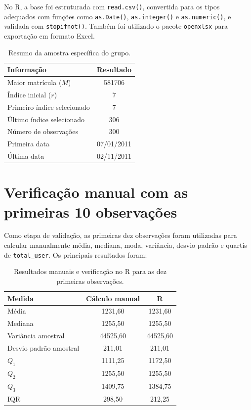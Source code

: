 \documentclass[12pt,oneside,a4paper,english,brazil]{abntex2}
\begin{document}
No R, a base foi estruturada com \texttt{read.csv()}, convertida para os tipos adequados com funções como \texttt{as.Date()}, \texttt{as.integer()} e \texttt{as.numeric()}, e validada com \texttt{stopifnot()}. Também foi utilizado o pacote \texttt{openxlsx} para exportação em formato Excel.

\begin{table}[H]
\centering
\caption{Resumo da amostra específica do grupo.}
\begin{tabular}{lc}
\toprule
\rowcolor{lilasclaro}
\textbf{Informação} & \textbf{Resultado} \\
\midrule
Maior matrícula ($M$) & 581706 \\
Índice inicial ($r$) & 7 \\
Primeiro índice selecionado & 7 \\
Último índice selecionado & 306 \\
Número de observações & 300 \\
Primeira data & 07/01/2011 \\
Última data & 02/11/2011 \\
\bottomrule
\end{tabular}
\end{table}

\section{Verificação manual com as primeiras 10 observações}

Como etapa de validação, as primeiras dez observações foram utilizadas para calcular manualmente média, mediana, moda, variância, desvio padrão e quartis de \texttt{total\_user}. Os principais resultados foram:

\begin{table}[H]
\centering
\caption{Resultados manuais e verificação no R para as dez primeiras observações.}
\begin{tabular}{lcc}
\toprule
\rowcolor{lilasclaro}
\textbf{Medida} & \textbf{Cálculo manual} & \textbf{R} \\
\midrule
Média & 1231,60 & 1231,60 \\
Mediana & 1255,50 & 1255,50 \\
Variância amostral & 44525,60 & 44525,60 \\
Desvio padrão amostral & 211,01 & 211,01 \\
$Q_1$ & 1111,25 & 1172,50 \\
$Q_2$ & 1255,50 & 1255,50 \\
$Q_3$ & 1409,75 & 1384,75 \\
IQR & 298,50 & 212,25 \\
\bottomrule
\end{tabular}
\end{table}
\end{document}
